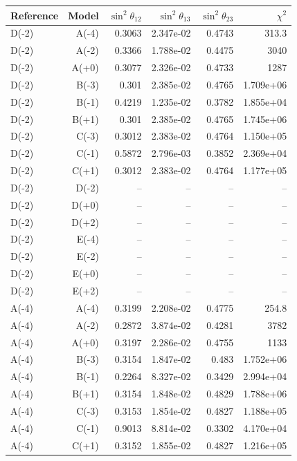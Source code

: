 \begin{table}[htbp]
\centering
\small
\setlength{\tabcolsep}{3.4pt}
\begin{tabular}{lrrrrr}
\hline
Reference & Model & $\sin^2\theta_{12}$ & $\sin^2\theta_{13}$ & $\sin^2\theta_{23}$ & $\chi^2$ \\
\hline
D(-2) & A(-4) & 0.3063 & 2.347e-02 & 0.4743 & 313.3 \\
D(-2) & A(-2) & 0.3366 & 1.788e-02 & 0.4475 & 3040 \\
D(-2) & A(+0) & 0.3077 & 2.326e-02 & 0.4733 & 1287 \\
D(-2) & B(-3) & 0.301 & 2.385e-02 & 0.4765 & 1.709e+06 \\
D(-2) & B(-1) & 0.4219 & 1.235e-02 & 0.3782 & 1.855e+04 \\
D(-2) & B(+1) & 0.301 & 2.385e-02 & 0.4765 & 1.745e+06 \\
D(-2) & C(-3) & 0.3012 & 2.383e-02 & 0.4764 & 1.150e+05 \\
D(-2) & C(-1) & 0.5872 & 2.796e-03 & 0.3852 & 2.369e+04 \\
D(-2) & C(+1) & 0.3012 & 2.383e-02 & 0.4764 & 1.177e+05 \\
D(-2) & D(-2) & -- & -- & -- & -- \\
D(-2) & D(+0) & -- & -- & -- & -- \\
D(-2) & D(+2) & -- & -- & -- & -- \\
D(-2) & E(-4) & -- & -- & -- & -- \\
D(-2) & E(-2) & -- & -- & -- & -- \\
D(-2) & E(+0) & -- & -- & -- & -- \\
D(-2) & E(+2) & -- & -- & -- & -- \\
A(-4) & A(-4) & 0.3199 & 2.208e-02 & 0.4775 & 254.8 \\
A(-4) & A(-2) & 0.2872 & 3.874e-02 & 0.4281 & 3782 \\
A(-4) & A(+0) & 0.3197 & 2.286e-02 & 0.4755 & 1133 \\
A(-4) & B(-3) & 0.3154 & 1.847e-02 & 0.483 & 1.752e+06 \\
A(-4) & B(-1) & 0.2264 & 8.327e-02 & 0.3429 & 2.994e+04 \\
A(-4) & B(+1) & 0.3154 & 1.848e-02 & 0.4829 & 1.788e+06 \\
A(-4) & C(-3) & 0.3153 & 1.854e-02 & 0.4827 & 1.188e+05 \\
A(-4) & C(-1) & 0.9013 & 8.814e-02 & 0.3302 & 4.170e+04 \\
A(-4) & C(+1) & 0.3152 & 1.855e-02 & 0.4827 & 1.216e+05 \\

\end{tabular}
\end{table}
